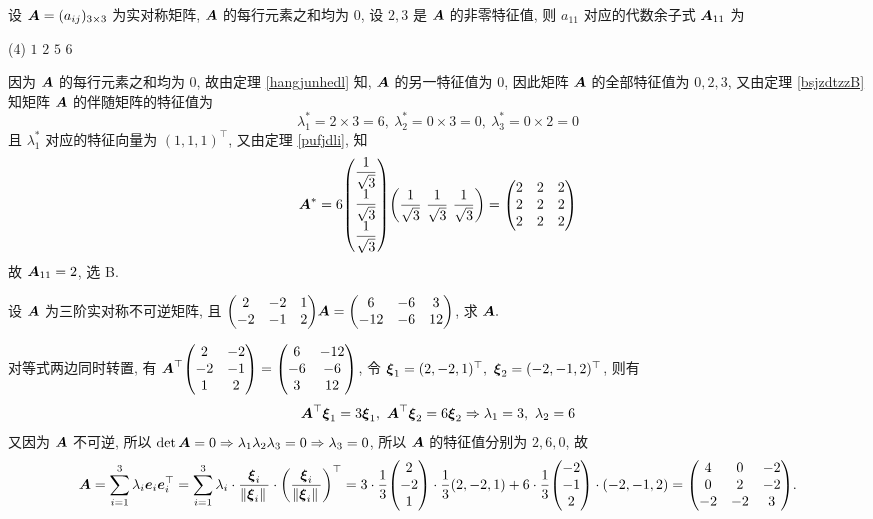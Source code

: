 \begin{example}
    设 $\vb*{A}=(a_{ij})_{3\times3}$ 为实对称矩阵, $\vb*{A}$ 的每行元素之和均为 $0$, 设 $2,3$ 是 $\vb*{A}$ 的非零特征值, 则 $a_{11}$ 对应的代数余子式 $\vb*{A}_{11}$ 为
    \begin{tasks}(4)
        \task $1$
        \task $2$
        \task $5$
        \task $6$
    \end{tasks}
\end{example}
\begin{solution}
    因为 $\vb*{A}$ 的每行元素之和均为 $0$, 故由定理 \ref{hangjunhedl} 知, $\vb*{A}$ 的另一特征值为 $0$, 因此矩阵 $\vb*{A}$ 的全部特征值为 $0,2,3$, 又由定理 \ref{bsjzdtzzB} 知矩阵 $\vb*{A}$ 的伴随矩阵的特征值为
    $$\lambda_1^*=2\times3=6,~\lambda_2^*=0\times 3=0,~\lambda_3^*=0\times 2=0$$
    且 $\lambda_1^*$ 对应的特征向量为 $(1,1,1)^\top$, 又由定理 \ref{pufjdli}, 知 $$\vb*{A}^*=6\mqty(\dfrac{1}{\sqrt{3}}\\[6pt]\dfrac{1}{\sqrt{3}}\\[6pt]\dfrac{1}{\sqrt{3}})\qty(\dfrac{1}{\sqrt{3}}~\dfrac{1}{\sqrt{3}}~\dfrac{1}{\sqrt{3}})=\mqty(2&2&2\\2&2&2\\2&2&2)$$
    故 $\vb*{A}_{11}=2$, 选 B.
\end{solution}

\begin{example}
    设 $\vb*{A}$ 为三阶实对称不可逆矩阵, 且 $\mqty(2&-2&1\\-2&-1&2)\vb*{A}=\mqty(6&-6&3\\-12&-6&12)$, 求 $\vb*{A}.$
\end{example}
\begin{solution}
    对等式两边同时转置, 有 $\vb*{A}^\top\mqty(2&-2\\-2&-1\\1&2)=\mqty(6&-12\\-6&-6\\3&12)$, 令 $\vb*{\xi}_1=(2,-2,1)^\top,~\vb*{\xi}_2=(-2,-1,2)^\top$, 则有 $$\vb*{A}^\top\vb*{\xi}_1=3\vb*{\xi}_1,~\vb*{A}^\top\vb*{\xi}_2=6\vb*{\xi}_2\Rightarrow \lambda_1=3,~\lambda_2=6$$
    又因为 $\vb*{A}$ 不可逆, 所以 $\det\vb*{A}=0\Rightarrow \lambda_1\lambda_2\lambda_3=0\Rightarrow \lambda_3=0$, 所以 $\vb*{A}$ 的特征值分别为 $2,6,0$, 故
    $$\vb*{A}=\sum_{i=1}^{3}\lambda_i\vb*{e}_i\vb*{e}_i^\top=\sum_{i=1}^{3}\lambda_i\cdot\dfrac{\vb*{\xi}_i}{\norm*{\vb*{\xi}_i}}\cdot\qty(\dfrac{\vb*{\xi}_i}{\norm*{\vb*{\xi}_i}})^\top=3\cdot\dfrac{1}{3}\mqty(2\\-2\\1)\cdot\dfrac{1}{3}(2,-2,1)+6\cdot\dfrac{1}{3}\mqty(-2\\-1\\2)\cdot(-2,-1,2)=\mqty(4&0&-2\\0&2&-2\\-2&-2&3).$$
\end{solution}

